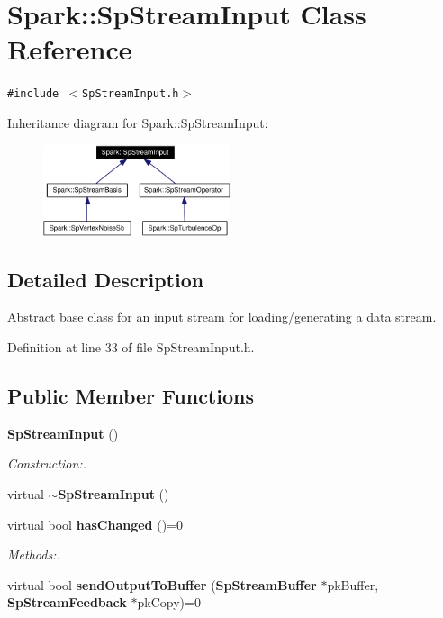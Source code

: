 \section{Spark::Sp\-Stream\-Input Class Reference}
\label{classSpark_1_1SpStreamInput}
{\tt \#include $<$Sp\-Stream\-Input.h$>$}

Inheritance diagram for Spark::Sp\-Stream\-Input:\begin{figure}[H]
\begin{center}
\leavevmode
\includegraphics[width=155pt]{classSpark_1_1SpStreamInput__inherit__graph}
\end{center}
\end{figure}


\subsection{Detailed Description}
Abstract base class for an input stream for loading/generating a data stream. 

Definition at line 33 of file Sp\-Stream\-Input.h.\subsection*{Public Member Functions}
\begin{CompactItemize}
\item 
{\bf Sp\-Stream\-Input} ()
\begin{CompactList}\small\item\em Construction:. \item\end{CompactList}\item 
virtual {\bf $\sim$Sp\-Stream\-Input} ()
\item 
virtual bool {\bf has\-Changed} ()=0
\begin{CompactList}\small\item\em Methods:. \item\end{CompactList}\item 
virtual bool {\bf send\-Output\-To\-Buffer} ({\bf Sp\-Stream\-Buffer} $\ast$pk\-Buffer, {\bf Sp\-Stream\-Feedback} $\ast$pk\-Copy)=0
\end{CompactItemize}


